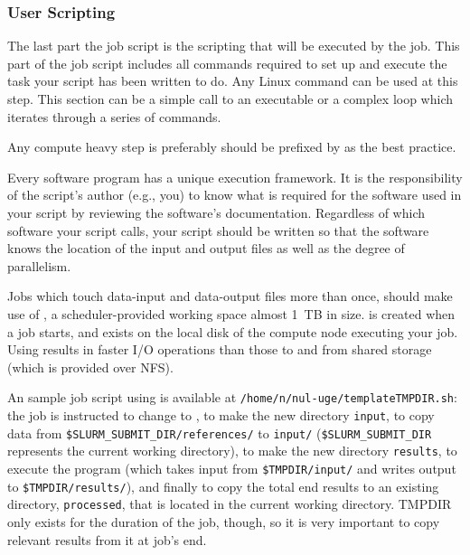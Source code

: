 \subsubsection{User Scripting}
\label{sect:scripting}

The last part the job script is the scripting that will be executed by the job. 
This part of the job script includes all commands required to set up and 
execute the task your script has been written to do. Any Linux command can be used 
at this step. This section can be a simple call to an executable or a complex 
loop which iterates through a series of commands.

Any compute heavy step is preferably should be prefixed by 
as the best practice.

Every software program has a unique execution framework. It is the responsibility 
of the script's author (e.g., you) to know what is required for the software used 
in your script by reviewing the software's documentation. Regardless of which software
your script calls, your script should be written so that the software knows the 
location of the input and output files as well as the degree of parallelism.
%

Jobs which touch data-input and data-output files more than once, should make use 
of , a scheduler-provided working space almost 1~TB in size.
 is created when a job starts, and exists on the local disk of the
compute node executing your job. Using  results in faster I/O operations 
than those to and from shared storage (which is provided over NFS). 

An sample job script using  is available at \texttt{/home/n/nul-uge/templateTMPDIR.sh}: 
the job is instructed to change to , to make the new directory \texttt{input}, to copy data from
\texttt{\$SLURM\_SUBMIT\_DIR/references/} to \texttt{input/} (\texttt{\$SLURM\_SUBMIT\_DIR} represents the
current working directory), to make the new directory \texttt{results}, to
execute the program (which takes input from \texttt{\$TMPDIR/input/} and writes
output to \texttt{\$TMPDIR/results/}), and finally to copy the total end results
to an existing directory, \texttt{processed}, that is located in the current
working directory.
TMPDIR only exists for the duration of the job, though,
so it is very important to copy relevant results from it at job's end.

